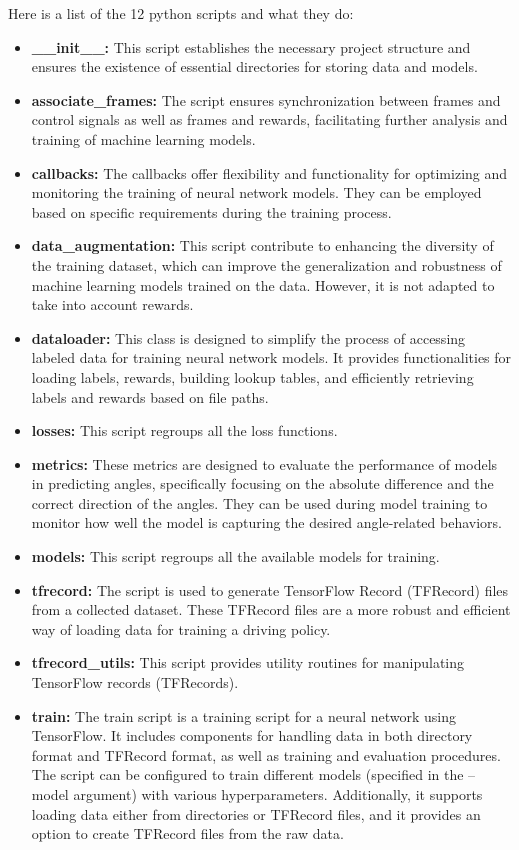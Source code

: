 \documentclass[12pt]{report}
\begin{document}
Here is a list of the 12 python scripts and what they do:
\begin{itemize}    
    \item \textbf{\_\_init\_\_:} This script establishes the necessary project structure and ensures the existence of essential directories for storing data and models.
    \item \textbf{associate\_frames:} The script ensures synchronization between frames and control signals as well as frames and rewards, facilitating further analysis and training of machine learning models.
    \item \textbf{callbacks:} The callbacks offer flexibility and functionality for optimizing and monitoring the training of neural network models. They can be employed based on specific requirements during the training process.
    \item \textbf{data\_augmentation:} This script contribute to enhancing the diversity of the training dataset, which can improve the generalization and robustness of machine learning models trained on the data. However, it is not adapted to take into account rewards.
    \item \textbf{dataloader:} This class is designed to simplify the process of accessing labeled data for training neural network models. It provides functionalities for loading labels, rewards, building lookup tables, and efficiently retrieving labels and rewards based on file paths.
    \item \textbf{losses:} This script regroups all the loss functions.
    \item \textbf{metrics:} These metrics are designed to evaluate the performance of models in predicting angles, specifically focusing on the absolute difference and the correct direction of the angles. They can be used during model training to monitor how well the model is capturing the desired angle-related behaviors.
    \item \textbf{models:} This script regroups all the available models for training.
    \item \textbf{tfrecord:} The script is used to generate TensorFlow Record (TFRecord) files from a collected dataset. These TFRecord files are a more robust and efficient way of loading data for training a driving policy. 
    \item \textbf{tfrecord\_utils:} This script provides utility routines for manipulating TensorFlow records (TFRecords).
    \item \textbf{train:} The train script is a training script for a neural network using TensorFlow. It includes components for handling data in both directory format and TFRecord format, as well as training and evaluation procedures. The script can be configured to train different models (specified in the --model argument) with various hyperparameters. Additionally, it supports loading data either from directories or TFRecord files, and it provides an option to create TFRecord files from the raw data.

\end{itemize}
\end{document}
